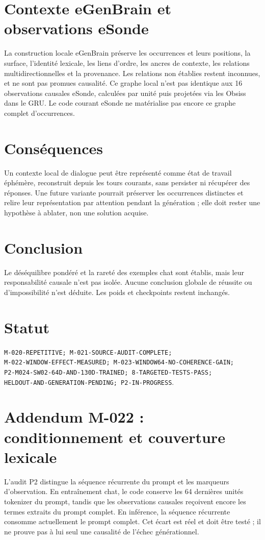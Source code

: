 \documentclass[11pt,a4paper]{report}
\begin{document}
\section{Contexte eGenBrain et observations eSonde}
La construction locale eGenBrain préserve les occurrences et leurs positions, la surface, l'identité lexicale, les liens d'ordre, les ancres de contexte, les relations multidirectionnelles et la provenance. Les relations non établies restent inconnues, et ne sont pas promues causalité. Ce graphe local n'est pas identique aux 16 observations causales eSonde, calculées par unité puis projetées via les Obsiss dans le GRU. Le code courant eSonde ne matérialise pas encore ce graphe complet d'occurrences.
\section{Conséquences}
Un contexte local de dialogue peut être représenté comme état de travail éphémère, reconstruit depuis les tours courants, sans persister ni récupérer des réponses. Une future variante pourrait préserver les occurrences distinctes et relire leur représentation par attention pendant la génération ; elle doit rester une hypothèse à ablater, non une solution acquise.
\section{Conclusion}
Le déséquilibre pondéré et la rareté des exemples chat sont établis, mais leur responsabilité causale n'est pas isolée. Aucune conclusion globale de réussite ou d'impossibilité n'est déduite. Les poids et checkpoints restent inchangés.
\section{Statut}
\begin{sloppypar}
\texttt{M-020-REPETITIVE; M-021-SOURCE-AUDIT-COMPLETE;}\\
\texttt{M-022-WINDOW-EFFECT-MEASURED; M-023-WINDOW64-NO-COHERENCE-GAIN;}\\
\texttt{P2-M024-SW02-64D-AND-130D-TRAINED; 8-TARGETED-TESTS-PASS;}\\
\texttt{HELDOUT-AND-GENERATION-PENDING; P2-IN-PROGRESS}.
\end{sloppypar}



\section*{Addendum M-022 : conditionnement et couverture lexicale}
L'audit P2 distingue la séquence récurrente du prompt et les marqueurs d'observation. En entraînement chat, le code conserve les 64 dernières unités tokenizer du prompt, tandis que les observations causales reçoivent encore les termes extraits du prompt complet. En inférence, la séquence récurrente consomme actuellement le prompt complet. Cet écart est réel et doit être testé ; il ne prouve pas à lui seul une causalité de l'échec générationnel.
\end{document}
